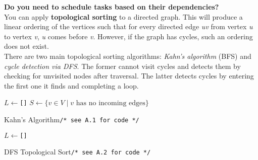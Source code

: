 \documentclass[12pt]{article}
\begin{document}
\begin{adjustwidth}{2em}{0pt}
    \textbf{Do you need to schedule tasks based on their dependencies?} \medskip\\
    You can apply \textbf{topological sorting} to a directed graph. This will produce a linear ordering of the vertices such that for every directed edge \textit{uv} from vertex \textit{u} to vertex \textit{v}, \textit{u} comes before \textit{v}. However, if the graph has cycles, such an ordering does not exist.\medskip\\
    There are two main topological sorting algorithms: \textit{Kahn's algorithm} (BFS) and \textit{cycle detection via DFS}. The former cannot visit cycles and detects them by checking for unvisited nodes after traversal. The latter detects cycles by entering the first one it finds and completing a loop.\\

    \begin{algorithm}[H]
      \SetAlgoLined
      \DontPrintSemicolon
      $L \longleftarrow$\hspace{0.5mm}\texttt{[]}\;
      $S \longleftarrow \{v \in V \mid v \text{ has no incoming edges}\}$\;
      \caption{Kahn's Algorithm\hspace{13mm}\texttt{/* see A.1 for code */}}
    \end{algorithm}
    \bigskip

    \begin{algorithm}[H]
      \SetAlgoLined
      \DontPrintSemicolon
      $L \longleftarrow$\hspace{0.5mm}\texttt{[]}\;
      \;
      \caption{DFS Topological Sort\hspace{8mm}\texttt{/* see A.2 for code */}}
    \end{algorithm}
\end{adjustwidth}
\end{document}
